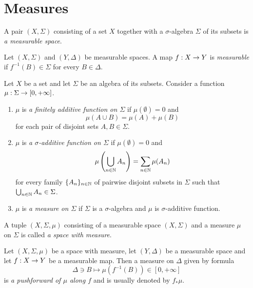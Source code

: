 \section{Measures}

\begin{definition}
    A pair $(X,\Sigma)$ consisting of a set $X$ together with a $\sigma$-algebra $\Sigma$ of its subsets is \textit{a measurable space}.
\end{definition}

\begin{definition}
    Let $(X,\Sigma)$ and $(Y,\Delta)$ be measurable spaces. A map $f:X\rightarrow Y$ is \textit{measurable} if $f^{-1}(B)\in \Sigma$ for every $B\in \Delta$.
\end{definition}

\begin{definition}
    Let $X$ be a set and let $\Sigma$ be an algebra of its subsets. Consider a function $\mu:\Sigma \rightarrow [0,+\infty]$.
    \begin{enumerate}[label=\textbf{(\arabic*)}, leftmargin=*]
        \item $\mu$ is \textit{a finitely additive function on $\Sigma$} if $\mu(\emptyset) = 0$ and
              $$\mu\left(A\cup B\right) = \mu(A) + \mu(B)$$
              for each pair of disjoint sets $A,B\in \Sigma$.
        \item $\mu$ is \textit{a $\sigma$-additive function on $\Sigma$} if $\mu(\emptyset) = 0$ and
              $$\mu\left(\bigcup_{n\in {\mathbb N}}A_n\right)=\sum_{n\in {\mathbb N}}\mu(A_n)$$
              for every family  $\{A_n\}_{n\in {\mathbb N}}$ of pairwise disjoint subsets in $\Sigma$ such that $\bigcup_{n\in {\mathbb N}}A_n\in \Sigma$.
        \item $\mu$ is \textit{a measure on $\Sigma$} if $\Sigma$ is a $\sigma$-algebra and $\mu$ is $\sigma$-additive function.
    \end{enumerate}
\end{definition}

\begin{definition}
    A tuple $(X,\Sigma,\mu)$ consisting of a measurable space $\left(X,\Sigma\right)$ and a measure $\mu$ on $\Sigma$ is called \textit{a space with measure}.
\end{definition}

\begin{definition}
    Let $(X,\Sigma,\mu)$ be a space with measure, let $(Y,\Delta)$ be a measurable space and let $f:X\rightarrow Y$ be a measurable map. Then a measure on $\Delta$ given by formula
    $$\Delta \ni B \mapsto \mu\left(f^{-1}(B)\right) \in [0,+\infty]$$
    is \textit{a pushforward of $\mu$ along $f$} and is usually denoted by $f_*\mu$.
\end{definition}

